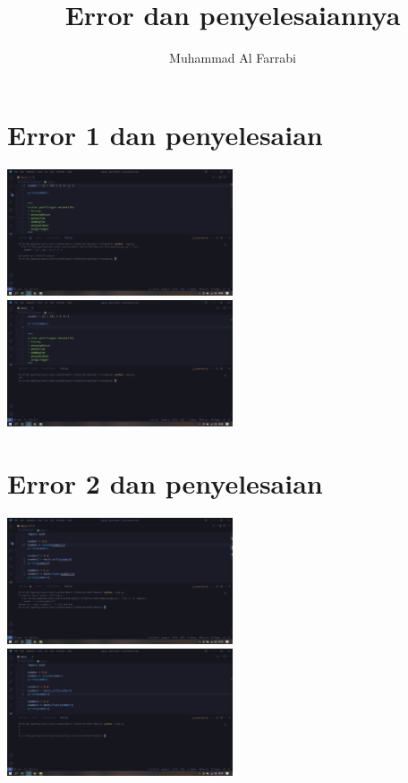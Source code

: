 \documentclass{article}
\title{Error dan penyelesaiannya}
\author{Muhammad Al Farrabi}
\begin{document}
\maketitle

\section{Error 1 dan penyelesaian}
\includegraphics[width=0.5\textwidth]{gambar/09_error.png}
\includegraphics[width=0.5\textwidth]{gambar/09_penanganan.png}

\section{Error 2 dan penyelesaian}
\includegraphics[width=0.5\textwidth]{gambar/10_error.png}
\includegraphics[width=0.5\textwidth]{gambar/10_penanganan.png}
\end{document}
